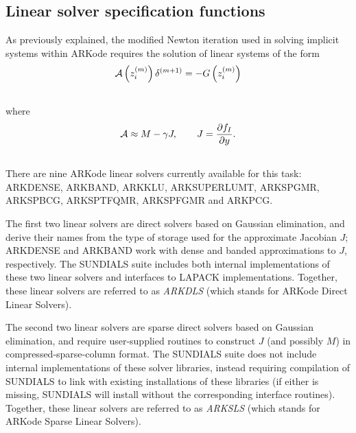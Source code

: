 \documentclass[letterpaper,10pt,english]{sphinxmanual}
\begin{document}
\subsection{Linear solver specification functions}
\label{c_interface/User_callable:cinterface-linearsolvers}\label{c_interface/User_callable:linear-solver-specification-functions}
As previously explained, the modified Newton iteration used in solving
implicit systems within ARKode requires the solution of linear
systems of the form
\begin{gather}
\begin{split}{\mathcal A}\left(z_i^{(m)}\right) \delta^{(m+1)} = -G\left(z_i^{(m)}\right)\end{split}\notag\\\begin{split}\end{split}\notag
\end{gather}
where
\begin{gather}
\begin{split}{\mathcal A} \approx M - \gamma J, \qquad J = \frac{\partial f_I}{\partial y}.\end{split}\notag\\\begin{split}\end{split}\notag
\end{gather}
There are nine ARKode linear solvers currently available for this
task: ARKDENSE, ARKBAND, ARKKLU, ARKSUPERLUMT, ARKSPGMR, ARKSPBCG,
ARKSPTFQMR, ARKSPFGMR and ARKPCG.

The first two linear solvers are direct solvers based on Gaussian
elimination, and derive their names from the type of storage used for
the approximate Jacobian $J$; ARKDENSE and ARKBAND work with
dense and banded approximations to $J$, respectively. The
SUNDIALS suite includes both internal implementations of these two
linear solvers and interfaces to LAPACK implementations. Together,
these linear solvers are referred to as \emph{ARKDLS} (which stands for
ARKode Direct Linear Solvers).

The second two linear solvers are sparse direct solvers based on
Gaussian elimination, and require user-supplied routines to construct
$J$ (and possibly $M$) in compressed-sparse-column
format.  The SUNDIALS suite does not include internal implementations
of these solver libraries, instead requiring compilation of SUNDIALS
to link with existing installations of these libraries (if either is
missing, SUNDIALS will install without the corresponding interface
routines).  Together, these linear solvers are referred to as \emph{ARKSLS}
(which stands for ARKode Sparse Linear Solvers).
\end{document}

